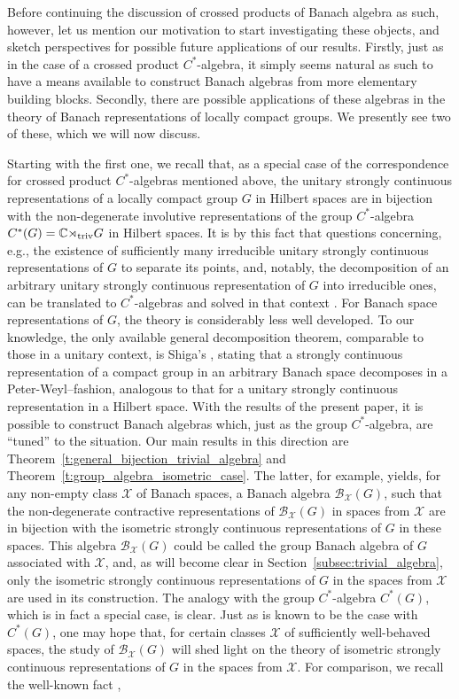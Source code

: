 \documentclass{amsart}
\theoremstyle{plain}
\theoremstyle{definition}
\numberwithin{equation}{section}
\begin{document}
Before continuing the discussion of crossed products of Banach algebra as such, however, let us mention our motivation to start investigating these objects, and sketch perspectives for possible future applications of our results. Firstly, just as in the case of a crossed product $C^*$-algebra, it simply seems natural as such to have a means available to construct Banach algebras from more elementary building blocks. Secondly, there are possible applications of these algebras in the theory of Banach representations of locally compact groups. We presently see two of these, which we will now discuss.

Starting with the first one, we recall that, as a special case of the correspondence for crossed product $C^*$-algebras mentioned above, the unitary strongly continuous representations of a locally compact group $G$ in Hilbert spaces are in bijection with the non-degenerate involutive representations of the group $C^*$-algebra $C^*(G)=\mathbb C{\rtimes}_{\textup{triv}} G$ in Hilbert spaces. It is by this fact that questions concerning, e.g.,  the existence of sufficiently many irreducible unitary strongly continuous representations of $G$ to separate its points, and, notably, the decomposition of an arbitrary unitary strongly continuous representation of $G$ into irreducible ones, can be translated to $C^*$-algebras and solved in that context \cite{dixmier}. For Banach space representations of $G$, the theory is considerably less well developed. To our knowledge, the only available general decomposition theorem, comparable to those in a unitary context, is Shiga's \cite{shiga}, stating that a strongly continuous representation of a compact group in an arbitrary Banach space decomposes in a Peter-Weyl--fashion, analogous to that for a unitary strongly continuous representation in a Hilbert space. With the results of the present paper, it is possible to construct Banach algebras  which, just as the group $C^*$-algebra, are ``tuned'' to the situation. Our main results in this direction are Theorem~\ref{t:general_bijection_trivial_algebra} and Theorem~\ref{t:group_algebra_isometric_case}. The latter, for example, yields, for any non-empty class ${\mathcal X}$ of Banach spaces, a Banach algebra $\mathcal B_{\mathcal X}(G)$, such that the non-degenerate contractive representations of $\mathcal B_{\mathcal X}(G)$ in spaces from ${\mathcal X}$ are in bijection with the isometric strongly continuous representations of $G$ in these spaces. This algebra $\mathcal B_{\mathcal X}(G)$ could be called the group Banach algebra of $G$ associated with ${\mathcal X}$, and, as will become clear in Section~\ref{subsec:trivial_algebra}, only the isometric strongly continuous representations of $G$ in the spaces from ${\mathcal X}$ are used in its construction. The analogy with the group $C^*$-algebra $C^*(G)$, which is in fact a special case, is clear. Just as is known to be the case with $C^*(G)$, one may hope that, for certain classes ${\mathcal X}$ of sufficiently well-behaved spaces, the study of $\mathcal B_{\mathcal X}(G)$ will shed light on the theory of isometric strongly continuous representations of $G$ in the spaces from ${\mathcal X}$. For comparison, we recall  the well-known fact \cite[Assertion~VI.1.32]{helemskii}, 
\end{document}
